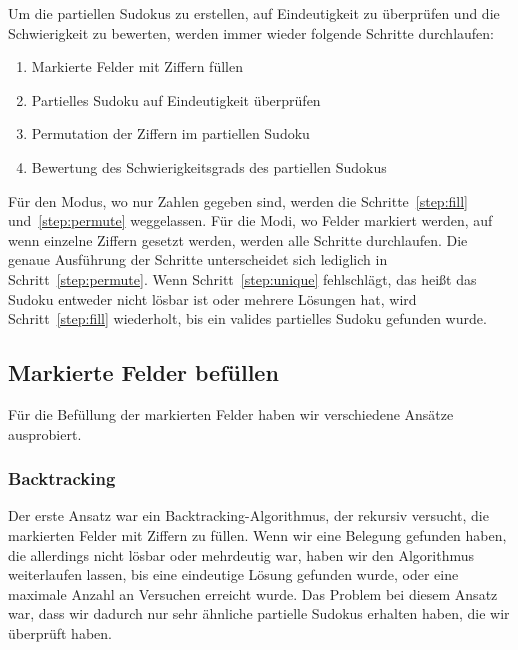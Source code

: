 Um die partiellen Sudokus zu erstellen, auf Eindeutigkeit zu überprüfen und die Schwierigkeit zu bewerten,
werden immer wieder folgende Schritte durchlaufen:
\begin{enumerate}
    \item \label{step:fill} Markierte Felder mit Ziffern füllen
    \item \label{step:unique} Partielles Sudoku auf Eindeutigkeit überprüfen
    \item \label{step:permute} Permutation der Ziffern im partiellen Sudoku
    \item \label{step:difficulty} Bewertung des Schwierigkeitsgrads des partiellen Sudokus
\end{enumerate}
Für den Modus, wo nur Zahlen gegeben sind, werden die Schritte~\ref{step:fill} und~\ref{step:permute} weggelassen.
Für die Modi, wo Felder markiert werden, auf wenn einzelne Ziffern gesetzt werden, werden alle Schritte durchlaufen.
Die genaue Ausführung der Schritte unterscheidet sich lediglich in Schritt~\ref{step:permute}.
Wenn Schritt~\ref{step:unique} fehlschlägt, das heißt das Sudoku entweder nicht lösbar ist oder mehrere Lösungen hat,
wird Schritt~\ref{step:fill} wiederholt, bis ein valides partielles Sudoku gefunden wurde.

\subsection{Markierte Felder befüllen}
Für die Befüllung der markierten Felder haben wir verschiedene Ansätze ausprobiert.

\subsubsection{Backtracking}
Der erste Ansatz war ein Backtracking-Algorithmus, der rekursiv versucht, die markierten Felder mit Ziffern zu füllen.
Wenn wir eine Belegung gefunden haben, die allerdings nicht lösbar oder mehrdeutig war, haben wir den Algorithmus weiterlaufen lassen,
bis eine eindeutige Lösung gefunden wurde, oder eine maximale Anzahl an Versuchen erreicht wurde.
Das Problem bei diesem Ansatz war, dass wir dadurch nur sehr ähnliche partielle Sudokus erhalten haben,
die wir überprüft haben.

